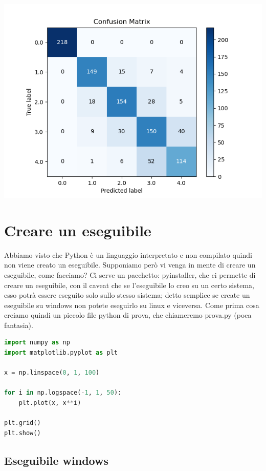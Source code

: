 \documentclass[10pt,a4paper]{article}
\begin{document}
\begin{center}
\includegraphics[scale=0.7]{img/pred_mod_loc.png}
\end{center}

\newpage


\section{Creare un eseguibile}

Abbiamo visto che Python è un linguaggio interpretato e non compilato quindi non viene creato un eseguibile. Supponiamo però vi venga in mente di creare un eseguibile, come facciamo?
Ci serve un pacchetto: pyinstaller, che ci permette di creare un eseguibile, con il caveat che se l'eseguibile lo creo su un certo sistema, esso potrà essere eseguito solo sullo stesso sistema; detto semplice se create un eseguibile su windows non potete eseguirlo su linux e viceversa. Come prima cosa creiamo quindi un piccolo file python di prova, che chiameremo prova.py (poca fantasia).

\begin{lstlisting}[language=Python]
import numpy as np
import matplotlib.pyplot as plt

x = np.linspace(0, 1, 100)

for i in np.logspace(-1, 1, 50):
    plt.plot(x, x**i)

plt.grid()
plt.show()
\end{lstlisting}

\subsection{Eseguibile windows}
\end{document}
